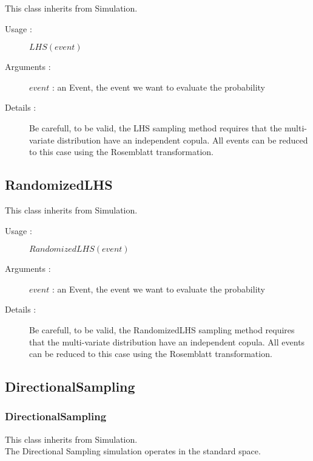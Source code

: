 This class inherits from Simulation.
\begin{description}
\item[Usage :] $LHS(event)$

\item[Arguments :] $event$ : an Event, the event we want to evaluate the probability
\item[Details :] Be carefull, to be valid, the LHS sampling method requires that the multi-variate distribution have an independent copula. All events can be reduced to this case using the Rosemblatt transformation.
\end{description}

\newpage \subsection{RandomizedLHS}

This class inherits from Simulation.
\begin{description}
\item[Usage :] $RandomizedLHS(event)$

\item[Arguments :] $event$ : an Event, the event we want to evaluate the probability
\item[Details :] Be carefull, to be valid, the RandomizedLHS sampling method requires that the multi-variate distribution have an independent copula. All events can be reduced to this case using the Rosemblatt transformation.
\end{description}

\newpage \subsection{DirectionalSampling}

\subsubsection{DirectionalSampling}

This class inherits from Simulation.\\

The Directional Sampling simulation operates in the standard space.

